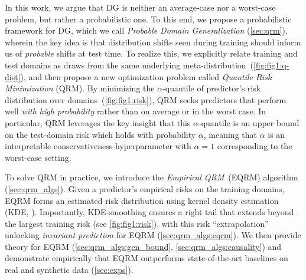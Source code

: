 \documentclass{article}
\begin{document}
%
%

%
%
%
%

In this work, we argue that DG is neither an average-case nor a worst-case problem, but rather a probabilistic one.
%
%
%
%
%
%
%
To this end, we propose a probabilistic framework for DG, which we call \textit{Probable Domain Generalization} (\cref{sec:qrm}), wherein the key idea is that distribution shifts seen during training should inform us of \emph{probable} shifts at test time.
%
%
%
 To realize this, we explicitly relate training and test domains as draws from the same underlying meta-distribution~(\cref{fig:fig1:q-dist}), and then propose a new optimization problem called \emph{Quantile Risk Minimization} (QRM). By minimizing the $\alpha$-quantile of predictor's risk distribution over domains~(\cref{fig:fig1:risk}), QRM seeks predictors that perform well \emph{with high probability} rather than on average or in the worst case. In particular, QRM leverages the key insight that this $\alpha$-quantile is an upper bound on the test-domain risk which holds with probability $\alpha$, meaning that $\alpha$ is an interpretable conservativeness-hyperparameter with $\alpha\! =\! 1$ corresponding to the worst-case setting.

To solve QRM in practice, we introduce the \textit{Empirical QRM}~(EQRM) algorithm (\cref{sec:qrm_algs}). Given a predictor's empirical risks on the training domains, EQRM forms an estimated risk distribution using kernel density estimation (KDE, \cite{parzen1962estimation}). Importantly, KDE-smoothing ensures a right tail that extends beyond the largest training risk (see \cref{fig:fig1:risk}), with this risk ``extrapolation''~\citep{krueger21rex} unlocking \emph{invariant prediction} for EQRM (\cref{sec:qrm_algs:eqrm}). 
%
%
We then provide theory for EQRM (\cref{sec:qrm_algs:gen_bound}, \cref{sec:qrm_algs:causality}) and demonstrate empirically that EQRM outperforms state-of-the-art baselines on real and synthetic data (\cref{sec:exps}).
%
%
\end{document}
